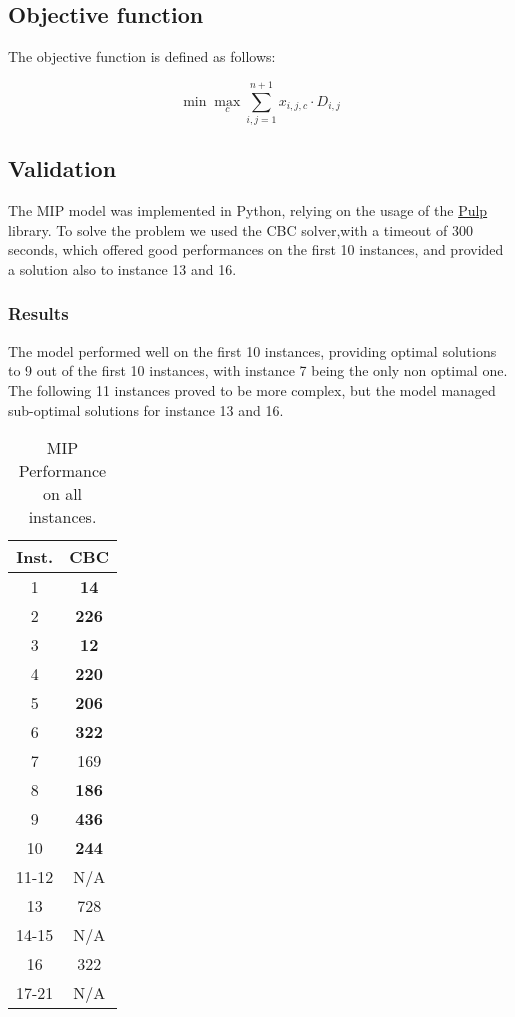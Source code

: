 \subsection{Objective function}

The objective function is defined as follows:

\[
\min \max_c \sum_{i,j =1}^{n+1} x_{i,j,c} \cdot D_{i,j}
\]

\subsection{Validation}

The MIP model was implemented in Python, relying on the usage of the   \href{https://coin-or.github.io/pulp/index.html}{Pulp} library. To solve the problem we used the CBC solver,with a timeout of 300 seconds, which offered good performances on the first 10 instances, and provided a solution also to instance 13 and 16.

\subsubsection{Results}

The model performed well on the first 10 instances, providing optimal solutions to 9 out of the first 10 instances, with instance 7 being the only non optimal one. The following 11 instances proved to be more complex, but the model managed sub-optimal solutions for instance 13 and 16. 

\begin{table}[ht]
\centering
\begin{tabular}{|c|c|}
\hline
Inst. & CBC \\\hline
1 & \textbf{14} \\
2 & \textbf{226} \\
3 & \textbf{12} \\
4 & \textbf{220} \\
5 & \textbf{206} \\
6 & \textbf{322} \\
7 & 169 \\
8 & \textbf{186} \\
9 & \textbf{436} \\
10 & \textbf{244} \\
11-12 & N/A \\
13 & 728 \\
14-15 & N/A \\
16 & 322 \\
17-21 & N/A \\
\hline
\end{tabular}
\caption{\label{tab:mip_results}MIP Performance on all instances.}
\end{table}